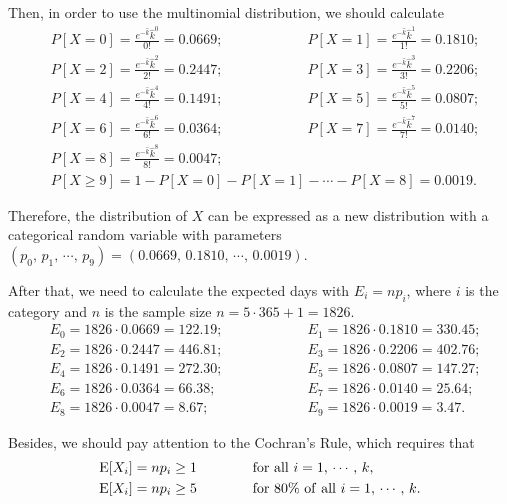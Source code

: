 \documentclass[a4paper]{article}
\begin{document}
	Then, in order to use the multinomial distribution, we should calculate 
\begin{equation}
\begin{split}
&P[X=0]=\frac{e^{-\hat{k}}{\hat{k}}^0}{0!}=0.0669; \qquad \qquad \qquad P[X=1]=\frac{e^{-\hat{k}}{\hat{k}}^1}{1!}=0.1810;  \\
&P[X=2]=\frac{e^{-\hat{k}}{\hat{k}}^2}{2!}=0.2447; \qquad \qquad \qquad P[X=3]=\frac{e^{-\hat{k}}{\hat{k}}^3}{3!}=0.2206;  \\
&P[X=4]=\frac{e^{-\hat{k}}{\hat{k}}^4}{4!}=0.1491; \qquad \qquad \qquad P[X=5]=\frac{e^{-\hat{k}}{\hat{k}}^5}{5!}=0.0807;  \\
&P[X=6]=\frac{e^{-\hat{k}}{\hat{k}}^6}{6!}=0.0364; \qquad \qquad \qquad P[X=7]=\frac{e^{-\hat{k}}{\hat{k}}^7}{7!}=0.0140;  \\
&P[X=8]=\frac{e^{-\hat{k}}{\hat{k}}^8}{8!}=0.0047;\\
&P[X\ge9]=1-P[X=0]-P[X=1]-\cdots-P[X=8]=0.0019.
\nonumber
\end{split}
\end{equation}

	Therefore, the distribution of $X$ can be expressed as a new distribution with a categorical random variable with parameters $(p_0,\,p_1,\,\cdots,\,p_9)=(0.0669,\, 0.1810,\,\cdots,\,0.0019)$.

	After that, we need to calculate the expected days with $E_i=np_i$, where $i$ is the category and $n$ is the sample size $n=5\cdot365+1=1826$.
\begin{equation}
\begin{split}
&E_0=1826\cdot0.0669=122.19; \qquad \qquad \qquad E_1=1826\cdot0.1810=330.45;  \\
&E_2=1826\cdot0.2447=446.81; \qquad \qquad \qquad E_3=1826\cdot0.2206=402.76;  \\
&E_4=1826\cdot0.1491=272.30; \qquad \qquad \qquad E_5=1826\cdot0.0807=147.27;  \\
&E_6=1826\cdot0.0364=66.38; \qquad \qquad \qquad \,\, \, E_7=1826\cdot0.0140=25.64;  \\
&E_8=1826\cdot0.0047=8.67; \qquad \qquad \qquad\,\, \,\,\, \, E_9=1826\cdot0.0019=3.47.
\nonumber
\end{split}
\end{equation}

	Besides, we should pay attention to the Cochran's Rule, which requires that
\begin{equation}
\begin{split}
&{\rm E}[X_i]=np_i\ge1\qquad \qquad {\rm for\ all}\ i=1,\,\cdots,\,k,\\
&{\rm E}[X_i]=np_i\ge5\qquad \qquad {\rm for\ 80\% \ of\ all}\ i=1,\,\cdots,\,k.
\nonumber
\end{split}
\end{equation}
\end{document}
